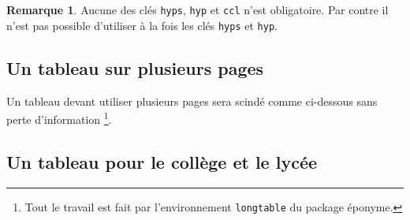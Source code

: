\documentclass[12pt,a4paper]{article}
\theoremstyle{definition}
\newtheorem*{remark}{Remarque}
\newcommand\env[1]{\texttt{#1}}
\begin{document}
\begin{remark}
    Aucune des clés \verb+hyps+, \verb+hyp+ et \verb+ccl+ n'est obligatoire.
    Par contre il n'est pas possible d'utiliser à la fois les clés \verb+hyps+ et \verb+hyp+.
\end{remark}




\subsection{Un tableau sur plusieurs pages}

Un tableau devant utiliser plusieurs pages sera scindé comme ci-dessous sans perte d'information
\footnote{
	Tout le travail est fait par l'environnement \env{longtable} du package éponyme.
}.

\begin{figure}[hbt!]
	\centering
\end{figure}

\subsection{Un tableau pour le collège et le lycée} \label{tnslog-tab-hard-proof-for-youngs}
\end{document}
